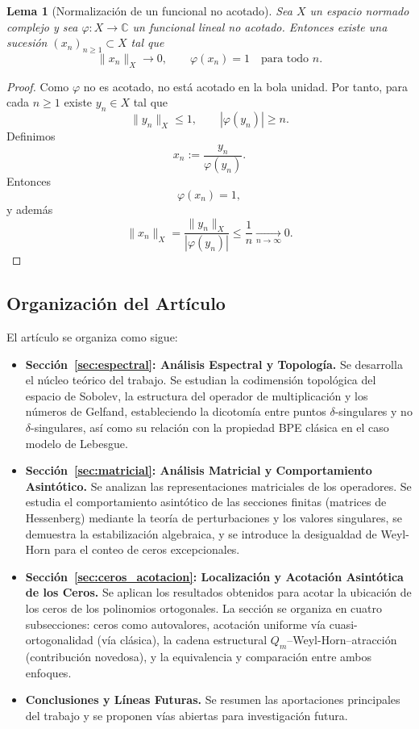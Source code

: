 \documentclass[12pt,a4paper]{article}
\newtheorem{lemma}{Lema}
\theoremstyle{definition}
\theoremstyle{remark}
\begin{document}
\begin{lemma}[Normalización de un funcional no acotado]\label{lem:normalizacion_funcional_no_acotado}
  Sea $X$ un espacio normado complejo y sea $\varphi:X\to\mathbb C$ un funcional lineal no acotado.
  Entonces existe una sucesión $(x_n)_{n\ge1}\subset X$ tal que
  \[
    \|x_n\|_X\to 0,
    \qquad
    \varphi(x_n)=1
    \quad \text{para todo } n.
  \]
\end{lemma}

\begin{proof}
  Como $\varphi$ no es acotado, no está acotado en la bola unidad. Por tanto, para cada
  $n\ge1$ existe $y_n\in X$ tal que
  \[
    \|y_n\|_X\le 1,
    \qquad
    |\varphi(y_n)|\ge n.
  \]
  Definimos
  \[
    x_n:=\frac{y_n}{\varphi(y_n)}.
  \]
  Entonces
  \[
    \varphi(x_n)=1,
  \]
  y además
  \[
    \|x_n\|_X
    =
    \frac{\|y_n\|_X}{|\varphi(y_n)|}
    \le
    \frac1n
    \xrightarrow[n\to\infty]{}0.
  \]
\end{proof}

\subsection{Organización del Artículo}

El artículo se organiza como sigue:

\begin{itemize}
  \item \textbf{Sección~\ref{sec:espectral}: Análisis Espectral y Topología.} Se desarrolla el núcleo teórico del trabajo. Se estudian la codimensión topológica del espacio de Sobolev, la estructura del operador de multiplicación y los números de Gelfand, estableciendo la dicotomía entre puntos $\delta$-singulares y no $\delta$-singulares, así como su relación con la propiedad BPE clásica en el caso modelo de Lebesgue.

  \item \textbf{Sección~\ref{sec:matricial}: Análisis Matricial y Comportamiento Asintótico.} Se analizan las representaciones matriciales de los operadores. Se estudia el comportamiento asintótico de las secciones finitas (matrices de Hessenberg) mediante la teoría de perturbaciones y los valores singulares, se demuestra la estabilización algebraica, y se introduce la desigualdad de Weyl-Horn para el conteo de ceros excepcionales.

  \item \textbf{Sección~\ref{sec:ceros_acotacion}: Localización y Acotación Asintótica de los Ceros.} Se aplican los resultados obtenidos para acotar la ubicación de los ceros de los polinomios ortogonales. La sección se organiza en cuatro subsecciones: ceros como autovalores, acotación uniforme vía cuasi-ortogonalidad (vía clásica), la cadena estructural $Q_m$--Weyl-Horn--atracción (contribución novedosa), y la equivalencia y comparación entre ambos enfoques.

  \item \textbf{Conclusiones y Líneas Futuras.} Se resumen las aportaciones principales del trabajo y se proponen vías abiertas para investigación futura.
\end{itemize}
\end{document}
